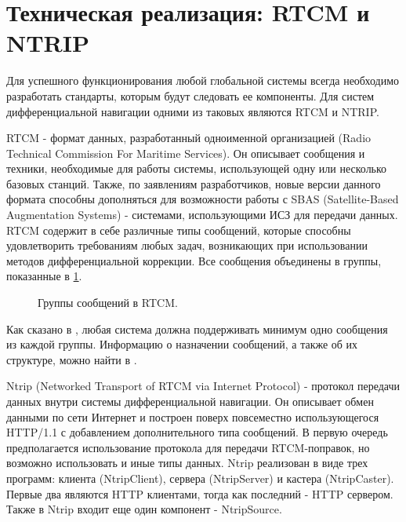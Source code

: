 \documentclass[a4paper,12pt]{report}
\begin{document}
\section{Техническая реализация: RTCM и NTRIP}
\par Для успешного функционирования любой глобальной системы всегда необходимо разработать стандарты, которым будут следовать ее компоненты.
Для систем дифференциальной навигации одними из таковых являются RTCM и NTRIP. \par
RTCM - формат данных, разработанный одноименной организацией (Radio Technical Commission For Maritime Services). Он описывает сообщения и 
техники, необходимые для работы системы, использующей одну или несколько базовых станций. Также, по заявлениям разработчиков, новые версии 
данного формата способны дополняться для возможности работы с SBAS (Satellite-Based Augmentation Systems) - системами, использующими 
ИСЗ для передачи данных. RTCM содержит в себе различные типы сообщений, которые способны удовлетворить требованиям любых 
задач, возникающих при использовании методов дифференциальной коррекции. Все сообщения объединены в группы, показанные в \ref{rtcm_groups}. \\

\begin{figure}[h]
\caption{Группы сообщений в RTCM.}
\label{rtcm_groups}
\end{figure}

Как сказано в \cite{rtcm}, любая система должна поддерживать минимум одно сообщения из каждой группы. Информацию о назначении сообщений, а 
также об их структуре, можно найти в \cite{rtcm}. \par
Ntrip (Networked Transport of RTCM via Internet Protocol) - протокол передачи данных внутри системы дифференциальной навигации. Он описывает 
обмен данными по сети Интернет и построен поверх повсеместно использующегося HTTP/1.1 с добавлением дополнительного типа сообщений. В первую 
очередь предполагается использование протокола для передачи RTCM-поправок, но возможно использовать и иные типы данных. Ntrip реализован в 
виде трех программ: клиента (NtripClient), сервера (NtripServer) и кастера (NtripCaster). Первые два являются HTTP клиентами, тогда как 
последний  - HTTP сервером. Также в Ntrip входит еще один компонент - NtripSource. \\
\end{document}
